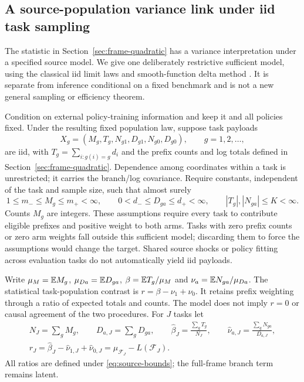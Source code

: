 \subsection{A source-population variance link under iid task sampling}
\label{sec:source-population}

The statistic in Section~\ref{sec:frame-quadratic} has a variance interpretation under a specified source model. We give one deliberately restrictive sufficient model, using the classical iid limit laws and smooth-function delta method \citep{vandervaart1998asymptotic}. It is separate from inference conditional on a fixed benchmark and is not a new general sampling or efficiency theorem.

Condition on external policy-training information and keep it and all policies fixed. Under the resulting fixed population law, suppose task payloads
\[
 X_g=(M_g,T_g,N_{g1},D_{g1},N_{g0},D_{g0}),\qquad g=1,2,\ldots,
\]
are iid, with $T_g=\sum_{i:g(i)=g}d_i$ and the prefix counts and log totals defined in Section~\ref{sec:frame-quadratic}. Dependence among coordinates within a task is unrestricted; it carries the branch/log covariance. Require constants, independent of the task and sample size, such that almost surely
\begin{equation}
 1\le m_-\le M_g\le m_+<\infty,\qquad
 0<d_-\le D_{ga}\le d_+<\infty,\qquad
 |T_g|,|N_{ga}|\le K<\infty.
 \label{eq:source-bounds}
\end{equation}
Counts $M_g$ are integers. These assumptions require every task to contribute eligible prefixes and positive weight to both arms. Tasks with zero prefix counts or zero arm weights fall outside this sufficient model; discarding them to force the assumptions would change the target. Shared source shocks or policy fitting across evaluation tasks do not automatically yield iid payloads.

Write $\mu_M=\mathbb{E} M_g$, $\mu_{Da}=\mathbb{E} D_{ga}$, $\beta=\mathbb{E} T_g/\mu_M$ and $\nu_a=\mathbb{E} N_{ga}/\mu_{Da}$. The statistical task-population contrast is $r=\beta-\nu_1+\nu_0$. It retains prefix weighting through a ratio of expected totals and counts. The model does not imply $r=0$ or causal agreement of the two procedures. For $J$ tasks let
\begin{equation}
 \begin{gathered}
 N_J=\sum_g M_g,\qquad D_{a,J}=\sum_g D_{ga},\qquad
 \widehat\beta_J=\frac{\sum_g T_g}{N_J},\qquad
 \widehat\nu_{a,J}=\frac{\sum_g N_{ga}}{D_{a,J}},\\
 r_J=\widehat\beta_J-\widehat\nu_{1,J}+\widehat\nu_{0,J}
     =\mu_{\mathcal F_J}-L(\mathcal F_J).
 \end{gathered}
 \label{eq:source-ratio}
\end{equation}
All ratios are defined under \eqref{eq:source-bounds}; the full-frame branch term remains latent.

